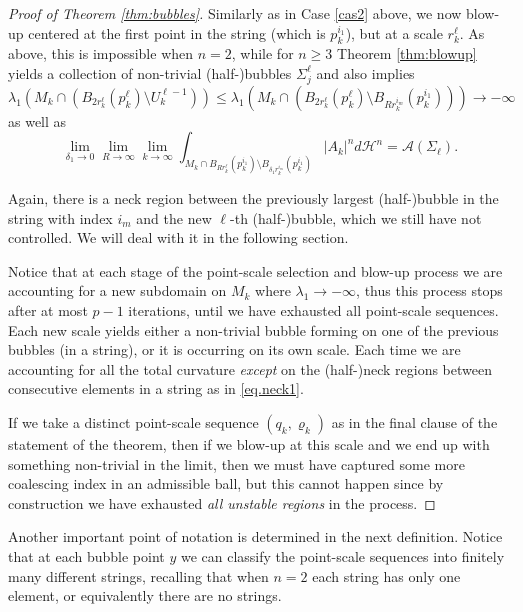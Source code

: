 \documentclass[10pt]{amsart}
\let\mathcal\mathscr
\newcounter{cas}
\theoremstyle{definition}
\newcommand{\h}{\mathscr{H}}
\begin{document}
\begin{proof}[Proof of Theorem \ref{thm:bubbles}]
Similarly as in Case \ref{cas2} above, we now blow-up centered at the first point in the string (which is $p^{i_1}_k$), but at a scale $r^\ell_k$. As above, this is impossible when $n=2$, while for $n\geq 3$ Theorem \ref{thm:blowup} yields a collection of non-trivial (half-)bubbles $\Sigma^\ell_j$ and also implies $$\lambda_1 (M_k\cap (B_{2r^\ell_k}(p^\ell_k)\setminus U^{\ell-1}_k))\leq\lambda_1(M_k\cap(B_{2r^\ell_k}(p^\ell_k)\setminus B_{Rr^{i_m}_k}(p^{i_1}_k)))\to -\infty$$ as well as
\begin{equation}\label{eq.lthbubble2}
\lim_{\delta_1\to 0 }\lim_{R\to \infty}\lim_{k\to \infty} \int_{M_k\cap B_{Rr^\ell_k}(p^{i_1}_k)\setminus B_{\delta_1 r^{i_m}_k}(p^{i_1}_k)} |A_k|^n d \h^n = \mathcal{A}(\Sigma_\ell).
\end{equation}

Again, there is a neck region between the previously largest (half-)bubble in the string with index $i_m$ and the new $\ell$-th (half-)bubble, which we still have not controlled. We will deal with it in the following section.

Notice that at each stage of the point-scale selection and blow-up process we are accounting for a new subdomain on $M_k$ where $\lambda_1 \to -\infty$, thus this process stops after at most $p-1$ iterations, until we have exhausted all point-scale sequences. Each new scale yields either a non-trivial bubble forming on one of the previous bubbles (in a string), or it is occurring on its own scale. Each time we are accounting for all the total curvature \emph{except} on the (half-)neck regions between consecutive elements in a string as in \eqref{eq.neck1}.

If we take a distinct point-scale sequence $(q_k,\varrho_k)$ as in the final clause of the statement of the theorem, then if we blow-up at this scale and we end up with something non-trivial in the limit, then we must have captured some more coalescing index in an admissible ball, but this cannot happen since by construction we have exhausted \emph{all unstable regions} in the process.
\end{proof}

Another important point of notation is determined in the next definition. Notice that at each bubble point $y$ we can classify the point-scale sequences into finitely many different strings, recalling that when $n=2$ each string has only one element, or equivalently there are no strings.
\end{document}
